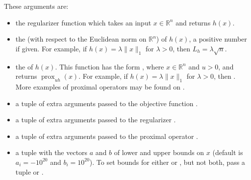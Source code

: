\documentclass[letterpaper,10pt,english]{sphinxmanual}
\begin{document}
\sphinxAtStartPar
These arguments are:
\begin{itemize}
\item {} 
\sphinxAtStartPar
{} \sphinxhyphen{} the regularizer function which takes an input \(x\in\mathbb{R}^n\) and returns \(h(x)\).

\item {} 
\sphinxAtStartPar
{} \sphinxhyphen{} the  (with respect to the Euclidean norm on \(\mathbb{R}^n\)) of \(h(x)\), a positive number if  given. For example, if \(h(x)=\lambda \|x\|_1\) for \(\lambda>0\), then \(L_h=\lambda \sqrt{n}\).

\item {} 
\sphinxAtStartPar
{} \sphinxhyphen{} the  of \(h(x)\). This function has the form , where \(x\in \mathbb{R}^n\) and \(u>0\), and returns \(\operatorname{prox}_{uh}(x)\). For example, if \(h(x)=\lambda \|x\|_1\) for \(\lambda>0\), then . More examples of proximal operators may be found on .

\item {} 
\sphinxAtStartPar
{} \sphinxhyphen{} a tuple of extra arguments passed to the objective function .

\item {} 
\sphinxAtStartPar
{} \sphinxhyphen{} a tuple of extra arguments passed to the regularizer .

\item {} 
\sphinxAtStartPar
{} \sphinxhyphen{} a tuple of extra arguments passed to the proximal operator .

\item {} 
\sphinxAtStartPar
{} \sphinxhyphen{} a tuple  with the vectors \(a\) and \(b\) of lower and upper bounds on \(x\) (default is \(a_i=-10^{20}\) and \(b_i=10^{20}\)). To set bounds for either  or , but not both, pass a tuple  or .


\end{itemize}
\end{document}
